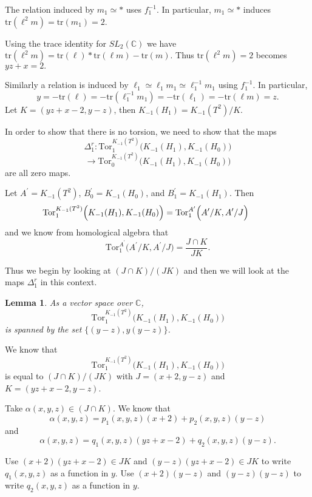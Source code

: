 \documentclass{slides}
\newcommand{\tr}{\mathrm{tr}}
\newcommand{\bbc}{\mathbb{C}}
\newcommand{\slc}{SL_2(\mathbb{C})}
\newtheorem{lemma}{Lemma}
\theoremstyle{definition}
\begin{document}
\begin{slide}
The relation induced by $m_1 \simeq *$ uses $f_1^{-1}$.
In particular, $m_1 \simeq *$ induces
$\tr(\ell^2 m) = \tr(m_1) = 2$.

Using the trace identity for
$\slc$ we have
$\tr(\ell^2 m) = \tr(\ell)*\tr(\ell m) - \tr(m)$.
Thus $\tr(\ell^2 m) = 2$ becomes $yz+x = 2.$

Similarly a relation is induced
by $\ell_1 \simeq \ell_1 m_1 \simeq \ell_1^{-1} m_1$ using $f_1^{-1}$.
In particular,
\[y = -\tr(\ell) = -\tr(\ell_1^{-1} m_1) = -\tr(\ell_1) = -\tr(\ell m) = z.\]
Let $K = (yz+x-2, y-z)$, then $K_{-1}(H_1) = K_{-1}(T^2) / K$.
\end{slide}

\begin{slide}
In order to show that there is no torsion, we need to
show that the maps
\[\Delta^r_1 :
\mathrm{Tor}^{K_{-1}(T^2)}_1 \Big( K_{-1}(H_1), K_{-1}(H_0) \Big)\]
\[
\to
\mathrm{Tor}^{K_{-1}(T^2)}_0 \Big( K_{-1}(H_1), K_{-1}(H_0) \Big)\]
are all zero maps.

Let $A^{\prime} = K_{-1}(T^2)$, $B^{\prime}_0 = K_{-1}(H_0)$, and
$B^{\prime}_1 = K_{-1}(H_1)$.  Then
\[\hspace{-1cm} \mathrm{Tor}^{K_{-1}(T^2)}_1 \Big( K_{-1}(H_1), K_{-1}(H_0) \Big) =
\mathrm{Tor}_1^{A^{\prime}} \Big( A^{\prime} / K, A^{\prime} / J \Big) \]
and we know from
homological algebra that
\[
\mathrm{Tor}_1^{A^{\prime}} \Big( A^{\prime} / K, A^{\prime} / J \Big)
= \frac{J \cap K}{JK}.
\]

Thus we begin by looking at $(J \cap K)/(JK)$ and then we will look at the
maps $\Delta^r_1$ in this context.
\end{slide}

\begin{slide}
\begin{lemma}
As a vector space over $\bbc$, $$\mathrm{Tor}_1^{K_{-1}(T^2)} \Big( K_{-1}(H_1),
K_{-1}(H_0) \Big)$$ is spanned by the set $\{ (y-z), y(y-z) \}$.
\end{lemma}

\proof
We know that $$\mathrm{Tor}_1^{K_{-1}(T^2)} \Big( K_{-1}(H_1),
K_{-1}(H_0) \Big)$$ is equal to $(J \cap K)/(JK)$ with $J = (x+2, y-z)$ and
$K = (yz+x-2, y-z)$.

Take $\alpha(x,y,z) \in (J \cap K)$.
We know that \[ \alpha(x,y,z) = p_1(x,y,z) (x+2) + p_2(x,y,z) (y-z) \] and
\[ \alpha(x,y,z) = q_1(x,y,z)(yz+x-2) + q_2(x,y,z) (y-z). \]

Use $(x+2)(yz+x-2) \in JK$ and $(y-z)(yz+x-2) \in JK$ to write $q_1(x,y,z)$
as a function in $y$.    Use $(x+2)(y-z)$ and $(y-z)(y-z)$ to write
$q_2(x,y,z)$ as a function in $y$.
\end{slide}
\end{document}
